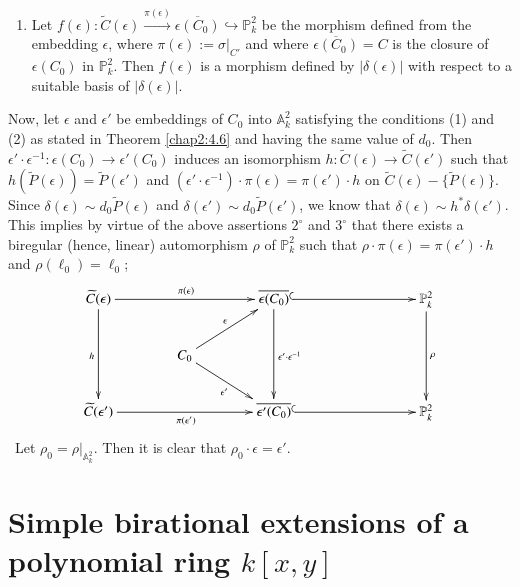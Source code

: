 \begin{proofoftheorem*}[4.6 ]
\begin{enumerate}
  \item Let
    $f(\epsilon):\widetilde{C}(\epsilon)\xrightarrow{\pi(\epsilon)}\overline{\epsilon(C_{0})}\hookrightarrow
    \mathbb{P}^{2}_{k}$ be the morphism defined from the embedding
    $\epsilon$, where $\pi(\epsilon):=\sigma|_{C'}$ and where
    $\overline{\epsilon(C_{0})}=C$ is the closure of $\epsilon(C_{0})$
    in $\mathbb{P}^{2}_{k}$. Then $f(\epsilon)$ is a morphism defined by
    $|\delta(\epsilon)|$ with respect to a suitable basis of
    $|\delta(\epsilon)|$.
  \end{enumerate}
  Now, let $\epsilon$ and $\epsilon'$ be embeddings of $C_{0}$ into
  $\mathbb{A}^{2}_{k}$ satisfying the conditions (1) and (2) as stated
  in Theorem \ref{chap2:4.6} and having the same value of $d_{0}$. Then
  $\epsilon'\cdot \epsilon^{-1}:\epsilon(C_{0})\to \epsilon'(C_{0})$
  induces an isomorphism $h:\widetilde{C}(\epsilon)\to
  \widetilde{C}(\epsilon')$ such that
  $h(\widetilde{P}(\epsilon))=\widetilde{P}(\epsilon')$ and
  $(\epsilon'\cdot \epsilon^{-1})\cdot \pi
  (\epsilon)=\pi(\epsilon')\cdot h$ on
  $\widetilde{C}(\epsilon)-\{\widetilde{P}(\epsilon)\}$. Since
  $\delta(\epsilon)\sim d_{0}\widetilde{P}(\epsilon)$ and
  $\delta(\epsilon')\sim d_{0}\widetilde{P}(\epsilon')$, we know that
  $\delta(\epsilon)\sim h^{\ast}\delta(\epsilon')$. This implies by
  virtue of the above assertions $2^{\circ}$ and $3^{\circ}$ that there
  exists a biregular (hence, linear) automorphism $\rho$ of
  $\mathbb{P}^{2}_{k}$ such that $\rho\cdot
  \pi(\epsilon)=\pi(\epsilon')\cdot h$ and $\rho(\ell_{0})=\ell_{0}$; 
  \[
  \xymatrix@C=1.4cm{
    \widetilde{C}(\epsilon)\ar[dd]_{h}\ar[rr]^{\pi(\epsilon)} & &
    \overline{\epsilon(C_{0})}\ar[dd]^{\epsilon'\cdot
      \epsilon^{-1}}\ar@{^{(}->}[rr] && \mathbb{P}^{2}_{k}\ar[dd]^{\rho}\\
    & C_{0}\ar[ur]^{\epsilon}\ar[dr]_{\epsilon'} && & \\
    \widetilde{C}(\epsilon')\ar[rr]_{\pi(\epsilon')} &&
    \overline{\epsilon'(C_{0})}\ar@{^{(}->}[rr] && \mathbb{P}^{2}_{k}
  }
  \]\pageoriginale\
  Let $\rho_{0}=\rho|_{\mathbb{A}^{2}_{k}}$. Then it is
  clear that $\rho_{0}\cdot\epsilon=\epsilon'$. 
\end{proofoftheorem*}


\section{Simple birational extensions of a polynomial ring
  $k[x,y]$}\label{chap2:sec5}\pageoriginale\

